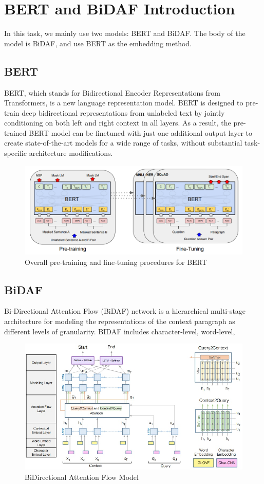 \documentclass{article}
\begin{document}
\section{BERT and BiDAF Introduction}
In this task, we mainly use two models: BERT and BiDAF. The body of the model is BiDAF, and use BERT as the embedding method.
\subsection{BERT}
BERT, which stands for Bidirectional Encoder Representations from Transformers, is a new language representation model. BERT is designed to pre-train deep bidirectional representations from unlabeled text by jointly conditioning on both left and right context in all layers. As a result, the pre-trained BERT model can be finetuned with just one additional output layer to create state-of-the-art models for a wide range of tasks, without substantial task-specific architecture modifications.\citet{DBLP:journals/corr/abs-1810-04805}
\begin{figure}[h]
	\centering
	\includegraphics[scale=0.4]{bert.png}
	\caption{Overall pre-training and fine-tuning procedures for BERT}
\end{figure}

\subsection{BiDAF}
Bi-Directional Attention Flow (BiDAF) network is a hierarchical multi-stage architecture for modeling the representations of the context paragraph as different levels of granularity. BIDAF includes character-level, word-level,  \citet{DBLP:journals/corr/SeoKFH16}
\begin{figure}[h]
	\centering
	\includegraphics[scale=0.5]{bidaf.jpg}
	\caption{BiDirectional Attention Flow Model}
\end{figure}
\end{document}
